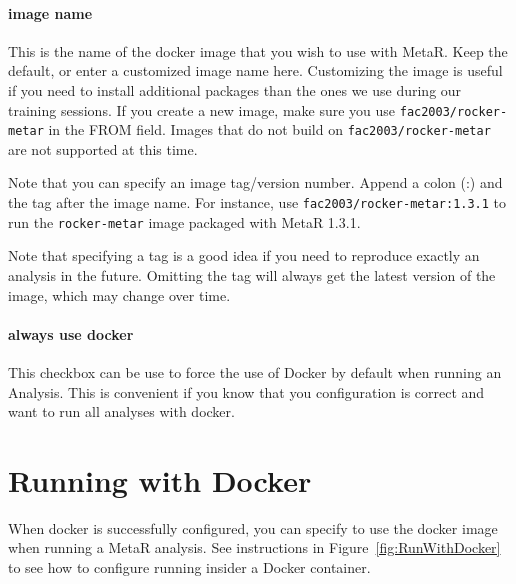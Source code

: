 \paragraph{image name}
This is the name of the docker image that you wish to use with MetaR. Keep the default, or enter a customized image name here. Customizing the image is useful if you need to install additional packages than the ones we use during our training sessions. If you create a new image, make sure you use \texttt{fac2003/rocker-metar} in the FROM field. Images that do not build on \texttt{fac2003/rocker-metar} are not supported at this time.

\begin{remark}
Note that you can specify an image tag/version number. Append a colon (:) and the tag after the image name. For instance, use \texttt{fac2003/rocker-metar:1.3.1} to run the \texttt{rocker-metar} image packaged with MetaR 1.3.1.  
\end{remark}

\begin{remark}
Note that specifying a tag is a good idea if you need to reproduce exactly an analysis in the future. Omitting the tag will always get the latest version of the image, which may change over time.  
\end{remark}

\paragraph{always use docker}
This checkbox can be use to force the use of Docker by default when running an Analysis. This is convenient if you know that you configuration is correct and want to run all analyses with docker. 

\section{Running with Docker}
When docker is successfully configured, you can specify to use the docker image when running a MetaR analysis. See instructions in Figure~\ref{fig:RunWithDocker} to see how to configure running insider a Docker container.


